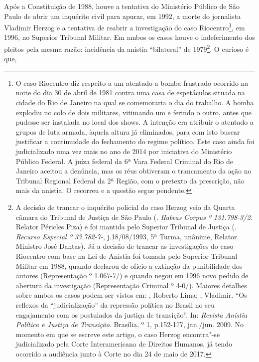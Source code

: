 Após a Constituição de 1988, houve a tentativa do Ministério Público de
São Paulo de abrir um inquérito civil para apurar, em 1992, a morte do
jornalista Vladimir Herzog e a tentativa de reabrir a investigação do
caso Riocentro\footnote{O caso Riocentro diz respeito a um atentado a
  bomba frustrado ocorrido na noite do dia 30 de abril de 1981 contra
  uma casa de espetáculos situada na cidade do Rio de Janeiro na qual se
  comemoraria o dia do trabalho. A bomba explodiu no colo de dois
  militares, vitimando um e ferindo o outro, antes que pudesse ser
  instalada no local dos shows. A intenção era atribuir o atentado a
  grupos de luta armada, àquela altura já eliminados, para com isto
  buscar justificar a continuidade do fechamento do regime político.
  Este caso ainda foi judicializado uma vez mais no ano de 2014 por
  iniciativa do Ministério Público Federal. A juíza federal da 6ª Vara
  Federal Criminal do Rio de Janeiro aceitou a denúncia, mas os réus
  obtiveram o trancamento da ação no Tribunal Regional Federal da 2ª
  Região, com o pretexto da prescrição, não mais da anistia. O 
  recorreu e a questão segue pendente.}, em 1996, no Superior Tribunal
Militar. Em ambos os casos houve o indeferimento dos pleitos pela mesma
razão: incidência da anistia ``bilateral'' de 1979\footnote{A decisão de
  trancar o inquérito policial do caso Herzog veio da Quarta câmara do
  Tribunal de Justiça de São Paulo (.
  \emph{Habeas Corpus º 131.798-3/2}. Relator Péricles Piza) e foi
  mantida pelo Superior Tribunal de Justiça (. \emph{Recurso Especial º 33.782-7-}, j.18/08/1993, 5ª
  Turma, unânime, Relator Ministro José Dantas). Já a decisão de trancar
  as investigações do caso Riocentro com base na Lei de Anistia foi
  tomada pelo Superior Tribunal Militar em 1988, quando declarou de
  ofício a extinção da punibilidade dos autores (Representação º
  1.067-7/) e quando negou em 1996 novo pedido de abertura da
  investigação (Representação Criminal º 4-0/). Maiores detalhes
  sobre ambos os casos podem ser vistos em: , Roberto Lima; 
  , Vladimir. ``Os reflexos da ``judicialização'' da repressão política
  no Brasil no seu engajamento com os postulados da justiça de
  transição''. In: \emph{Revista Anistia Política e Justiça de
  Transição}. Brasília, º 1, p.152-177, jan./jun. 2009. No momento em
  que se escreve este artigo, o caso Herzog encontra"-se judicializado
  pela Corte Interamericana de Direitos Humanos, já tendo ocorrido a
  audiência junto à Corte no dia 24 de maio de 2017.}. O curioso é que,
